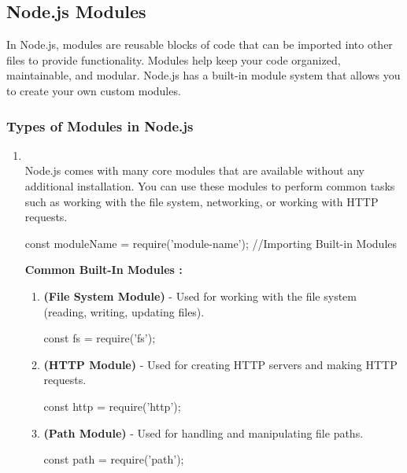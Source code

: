 \documentclass[12pt]{article}
\newenvironment{code}{
  \begin{mdframed}
}{
  \end{mdframed}
}
\begin{document}
\begin{mdframed}

\subsection{Node.js Modules}
In Node.js, modules are reusable blocks of code that can be imported into other files to provide functionality. Modules help keep your code organized, maintainable, and modular. Node.js has a built-in module system that allows you to create your own custom modules.

\subsubsection{Types of Modules in Node.js}

\begin{enumerate}

\item \textbf{} \\
  Node.js comes with many core modules that are available without any additional
  installation. You can use these modules to perform common tasks such as working with
  the file system, networking, or working with HTTP requests.
  \begin{code}
    const moduleName = require('module-name');
    //Importing Built-in Modules
  \end{code}
  \textbf{Common Built-In Modules :}

  \begin{enumerate}

  \item \textbf{ (File System Module)} - Used for working with the file system (reading, writing, updating files).
    \begin{code}
      const fs = require('fs');
    \end{code}

  \item \textbf{ (HTTP Module)} - Used for creating HTTP servers and making HTTP requests.
    \begin{code}
      const http = require('http');
    \end{code}

  \item \textbf{ (Path Module)} - Used for handling and manipulating file paths.
    \begin{code}
      const path = require('path');
    \end{code}


\end{enumerate}
\end{enumerate}
\end{mdframed}
\end{document}

